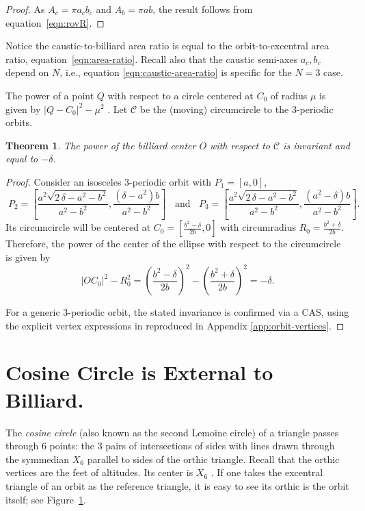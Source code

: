 \documentclass{article}
\newtheorem{theorem}{Theorem}
\theoremstyle{definition}
\begin{document}
\begin{proof}
As $A_c=\pi{a_c}{b_c}$ and $A_b={\pi}{a}{b}$, the result follows from equation~\eqref{eqn:rovR}.
\end{proof}

  Notice the caustic-to-billiard area ratio is equal to the orbit-to-excentral area ratio, equation~\eqref{eqn:area-ratio}. Recall also that the caustic semi-axes $a_c,b_c$ depend on $N$, i.e., equation  \eqref{eqn:caustic-area-ratio} is specific for the $N=3$ case.

The power of a point $Q$ with respect to a circle centered at $C_0$ of radius $\mu$ is given by $|Q-C_0|^2-\mu^2$ \cite[Circle Power]{mw}. Let $\mathcal{C}$ be the (moving) circumcircle to the 3-periodic orbits.

\begin{theorem}\label{thm:power_delta}
The power of the billiard center $O$ with respect to $\mathcal{C}$ is invariant and equal to $-\delta$.
\label{thm:delta-power}
\end{theorem}

\begin{proof}
 Consider an isosceles 3-periodic orbit with $P_1=[a,0]$,
 {\small  
 \[  \;  P_2   =\left[\frac {{a}^{2}\sqrt {2\,\delta-{a}^{2}-{b}^{2}}}{{a}^{2}-{b}^{2}},   
	\frac { \left(\delta  -{a}^{2}\right) b}{{a}^{2}-{b}^{2}}\right]\;\;
	 \text{ and  }\;\;  P_3= \left[{\frac {{a}^{2}\sqrt {2\,\delta-{a}^{2}-{b}^{2} }}{{a}^{2}-{b}^{2}}},
	{\frac { \left(  {a}^{2}-\delta \right) b}{{a}^{2}-{b}^{2}}}\right].
	\]
 }%
	Its circumcircle will be centered at $C_0=[ {\frac { {b}^{2}-\delta}{2b}},0]$ with circumradius $R_0=\frac {{b}^{2}+\delta}{2b}.$
	Therefore, the power of the center of the ellipse with respect to the circumcircle is given by  
	$$|OC_0|^2-R_0^2=\left(\frac { {b}^{2}-\delta}{2b}\right)^2 - \left(\frac {{b}^{2}+\delta}{2b}\right)^2=-\delta.$$

For a generic 3-periodic orbit, the stated invariance is confirmed via a CAS, using the explicit vertex expressions in \cite{garcia2019-ellipses} reproduced in Appendix \ref{app:orbit-vertices}.
\end{proof}

\section{Cosine Circle is External to Billiard.}
\label{sec:cosine-circle}
The {\em cosine circle} (also known as the second Lemoine circle) \cite[Cosine Circle]{mw} of a triangle passes through 6 points: the 3 pairs of intersections of sides with lines drawn through the symmedian $X_6$ parallel to sides of the orthic triangle. Recall that the orthic vertices are the feet of altitudes. Its center is $X_6$ \cite[Cosine Circle]{mw}. If one takes the excentral triangle of an orbit as the reference triangle, it is easy to see its orthic is the orbit itself; see Figure~\ref{sec:cosine-circle}.
\end{document}
